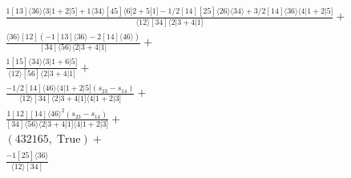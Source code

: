 \documentclass[varwidth, border=5pt]{standalone}
\begin{document}
\begin{my}
$\begin{gathered}
\scriptscriptstyle\frac{1[13]⟨36⟩⟨3|1+2|5]+1⟨34⟩[45]⟨6|2+5|1]-1/2[14][25]⟨26⟩⟨34⟩+3/2[14]⟨36⟩⟨4|1+2|5]}{⟨12⟩[34]⟨2|3+4|1]}+\\
\scriptscriptstyle\frac{⟨36⟩[12](-1[13]⟨36⟩-2[14]⟨46⟩)}{[34]⟨56⟩⟨2|3+4|1]}+\\
\scriptscriptstyle\frac{1[15]⟨34⟩⟨3|1+6|5]}{⟨12⟩[56]⟨2|3+4|1]}+\\
\scriptscriptstyle\frac{-1/2[14]⟨46⟩⟨4|1+2|5](s_{23}-s_{14})}{⟨12⟩[34]⟨2|3+4|1]⟨4|1+2|3]}+\\
\scriptscriptstyle\frac{1[12][14]⟨46⟩^2(s_{23}-s_{14})}{[34]⟨56⟩⟨2|3+4|1]⟨4|1+2|3]}+\\
\scriptscriptstyle(432165,\;\text{True})+\\
\scriptscriptstyle\frac{-1[25]⟨36⟩}{⟨12⟩[34]}\phantom{+}
\end{gathered}$
\end{my}
\end{document}
